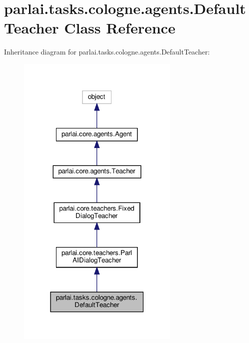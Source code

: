 \hypertarget{classparlai_1_1tasks_1_1cologne_1_1agents_1_1DefaultTeacher}{}\section{parlai.\+tasks.\+cologne.\+agents.\+Default\+Teacher Class Reference}
\label{classparlai_1_1tasks_1_1cologne_1_1agents_1_1DefaultTeacher}


Inheritance diagram for parlai.\+tasks.\+cologne.\+agents.\+Default\+Teacher\+:
\nopagebreak
\begin{figure}[H]
\begin{center}
\leavevmode
\includegraphics[width=219pt]{classparlai_1_1tasks_1_1cologne_1_1agents_1_1DefaultTeacher__inherit__graph}
\end{center}
\end{figure}



